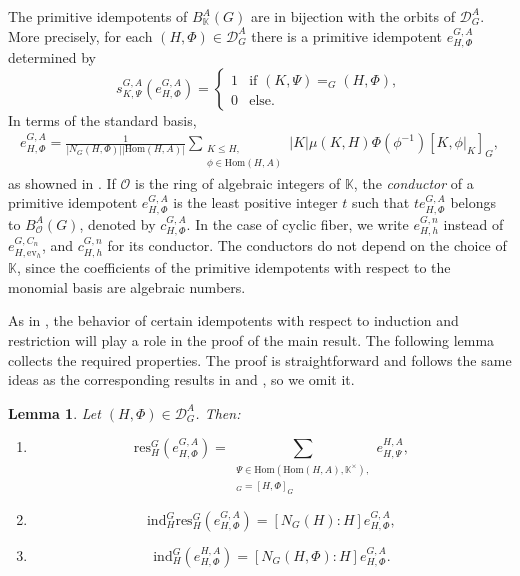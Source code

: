 \documentclass[letterpaper,12pt]{article}
\theoremstyle{plain}
\newtheorem{lemma}[theorem]{Lemma}
\theoremstyle{definition}
\newcommand{\K}{\mathbb{K}}
\newcommand{\BAKG}{B^A_{\mathbb{K}}(G)}
\newcommand{\BAOG}{B^A_{\mathcal{O}}(G)}
\newcommand{\DAG}{\mathcal{D}^A_G}
\newcommand{\eGAHPhi}{e^{G,A}_{H,\Phi}}
\newcommand{\cGAHPhi}{c^{G,A}_{H,\Phi}}
\newcommand{\eGnHh}{e^{G,n}_{H,h}}
\newcommand{\cGnHh}{c^{G,n}_{H,h}}
\begin{document}
The primitive idempotents of $\BAKG$ are in bijection with the orbits of $\DAG$. More precisely, for each $(H,\Phi)\in \DAG$ there is a primitive idempotent $\eGAHPhi$ determined by 
\[s^{G,A}_{K,\Psi}\left(\eGAHPhi\right)=\begin{cases}
    1 &\text{if }(K,\Psi)=_G (H,\Phi),\\
    0 &\text{else.}
\end{cases}\]
In terms of the standard basis,
\begin{align}
    \eGAHPhi=\frac{1}{|N_G(H,\Phi)||\mathrm{Hom}(H,A)|}\sum_{\substack{
    K\leq H,\\
    \phi\in \mathrm{Hom}(H,A)
    }
    }|K|\mu(K,H)\Phi(\phi^{-1})[K,\phi|_K]_G,
\end{align}
as showned in \cite{BolYil}. If $\mathcal{O}$ is the ring of algebraic integers of $\K$, the \textit{conductor} of a primitive idempotent $\eGAHPhi$ is the least positive integer $t$ such that $t\eGAHPhi$ belongs to $\BAOG$, denoted by $\cGAHPhi$. In the case of cyclic fiber, we write $\eGnHh$ instead of $e^{G,C_n}_{H,\mathrm{ev}_h}$, and $\cGnHh$ for its conductor. The conductors do not depend on the choice of $\K$, since the coefficients of the primitive idempotents with respect to the monomial basis are algebraic numbers. 

As in \cite{Muller}, the behavior of certain idempotents with respect to induction and restriction will play a role in the proof of the main result. The following lemma collects the required properties. The proof is straightforward and follows the same ideas as the corresponding results in \cite{GarRag} and \cite{Muller}, so we omit it.

\begin{lemma}
    Let $(H,\Phi)\in \mathcal{D}^A_G$. Then:
    \begin{enumerate}
        \item \[\mathrm{res}^G_H\left(e^{G,A}_{H,\Phi}\right)=\sum_{\substack{
        \Psi\in \mathrm{Hom}\left(\mathrm{Hom}(H,A), \K^{\times}\right),\\
        [H,\Psi]_G=[H,\Phi]_G
        }}e^{H,A}_{H,\Psi},\]
        \item \[\mathrm{ind}^G_H\mathrm{res}^G_H\left(e^{G,A}_{H,\Phi}\right)=[N_G(H):H]e^{G,A}_{H,\Phi},\]
        \item \[\mathrm{ind}^G_H\left(e^{H,A}_{H,\Phi}\right)=\left[N_G(H,\Phi):H\right]e^{G,A}_{H,\Phi}.\]
    \end{enumerate}
\end{lemma}
\end{document}
